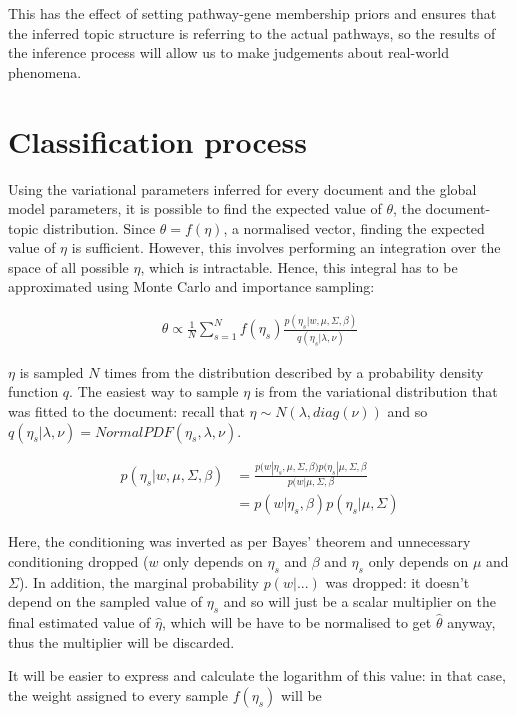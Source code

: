 \documentclass[12pt,a4paper,twoside,openright]{report}
\begin{document}
This has the effect of setting pathway-gene membership priors and ensures that the inferred topic structure is referring to the actual pathways, so the results of the inference process will allow us to make judgements about real-world phenomena.

\section{Classification process}

Using the variational parameters inferred for every document and the global model parameters, it is possible to find the expected value of $\theta$, the document-topic distribution. Since $\theta = f(\eta)$, a normalised vector, finding the expected value of $\eta$ is sufficient. However, this involves performing an integration over the space of all possible $\eta$, which is intractable. Hence, this integral has to be approximated using Monte Carlo and importance sampling:

\begin{align}
\hat\theta \propto \frac{1}{N}\sum\limits_{s=1}^N f(\eta_s) \frac{p(\eta_s | w, \mu, \Sigma, \beta)}{q(\eta_s | \lambda, \nu)}
\end{align}

$\eta$ is sampled $N$ times from the distribution described by a probability density function $q$. The easiest way to sample $\eta$ is from the variational distribution that was fitted to the document: recall that $\eta \sim N(\lambda, \mathit{diag}(\nu))$ and so $q(\eta_s | \lambda, \nu) = \mathit{NormalPDF}(\eta_s, \lambda, \nu)$.

\begin{align}
p(\eta_s | w, \mu, \Sigma, \beta) &= \frac{p(w | \eta_s, \mu, \Sigma, \beta)p(\eta_s | \mu, \Sigma, \beta}{p(w | \mu, \Sigma, \beta}\\
&= p(w | \eta_s, \beta) p(\eta_s | \mu, \Sigma)
\end{align}

Here, the conditioning was inverted as per Bayes' theorem and unnecessary conditioning dropped ($w$ only depends on $\eta_s$ and $\beta$ and $\eta_s$ only depends on $\mu$ and $\Sigma$). In addition, the marginal probability $p(w | ...)$ was dropped: it doesn't depend on the sampled value of $\eta_s$ and so will just be a scalar multiplier on the final estimated value of $\hat\eta$, which will be have to be normalised to get $\hat\theta$ anyway, thus the multiplier will be discarded.

It will be easier to express and calculate the logarithm of this value: in that case, the weight assigned to every sample $f(\eta_s)$ will be
\end{document}
